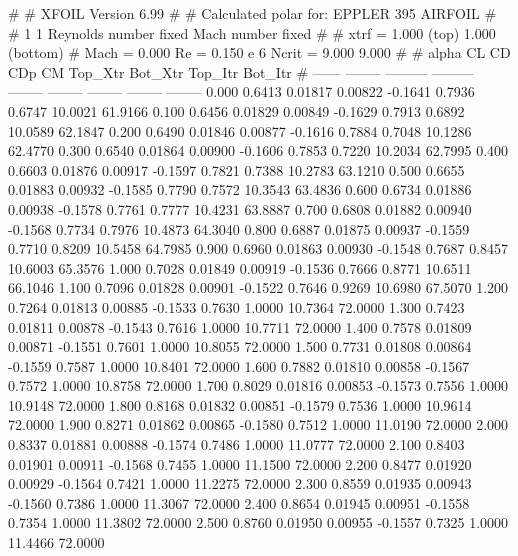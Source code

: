 #  
#       XFOIL         Version 6.99
#  
# Calculated polar for: EPPLER 395 AIRFOIL                              
#  
# 1 1 Reynolds number fixed          Mach number fixed         
#  
# xtrf =   1.000 (top)        1.000 (bottom)  
# Mach =   0.000     Re =     0.150 e 6     Ncrit =   9.000  9.000
#  
#   alpha    CL        CD       CDp       CM     Top_Xtr  Bot_Xtr  Top_Itr  Bot_Itr
#  ------ -------- --------- --------- -------- -------- -------- -------- --------
   0.000   0.6413   0.01817   0.00822  -0.1641   0.7936   0.6747  10.0021  61.9166
   0.100   0.6456   0.01829   0.00849  -0.1629   0.7913   0.6892  10.0589  62.1847
   0.200   0.6490   0.01846   0.00877  -0.1616   0.7884   0.7048  10.1286  62.4770
   0.300   0.6540   0.01864   0.00900  -0.1606   0.7853   0.7220  10.2034  62.7995
   0.400   0.6603   0.01876   0.00917  -0.1597   0.7821   0.7388  10.2783  63.1210
   0.500   0.6655   0.01883   0.00932  -0.1585   0.7790   0.7572  10.3543  63.4836
   0.600   0.6734   0.01886   0.00938  -0.1578   0.7761   0.7777  10.4231  63.8887
   0.700   0.6808   0.01882   0.00940  -0.1568   0.7734   0.7976  10.4873  64.3040
   0.800   0.6887   0.01875   0.00937  -0.1559   0.7710   0.8209  10.5458  64.7985
   0.900   0.6960   0.01863   0.00930  -0.1548   0.7687   0.8457  10.6003  65.3576
   1.000   0.7028   0.01849   0.00919  -0.1536   0.7666   0.8771  10.6511  66.1046
   1.100   0.7096   0.01828   0.00901  -0.1522   0.7646   0.9269  10.6980  67.5070
   1.200   0.7264   0.01813   0.00885  -0.1533   0.7630   1.0000  10.7364  72.0000
   1.300   0.7423   0.01811   0.00878  -0.1543   0.7616   1.0000  10.7711  72.0000
   1.400   0.7578   0.01809   0.00871  -0.1551   0.7601   1.0000  10.8055  72.0000
   1.500   0.7731   0.01808   0.00864  -0.1559   0.7587   1.0000  10.8401  72.0000
   1.600   0.7882   0.01810   0.00858  -0.1567   0.7572   1.0000  10.8758  72.0000
   1.700   0.8029   0.01816   0.00853  -0.1573   0.7556   1.0000  10.9148  72.0000
   1.800   0.8168   0.01832   0.00851  -0.1579   0.7536   1.0000  10.9614  72.0000
   1.900   0.8271   0.01862   0.00865  -0.1580   0.7512   1.0000  11.0190  72.0000
   2.000   0.8337   0.01881   0.00888  -0.1574   0.7486   1.0000  11.0777  72.0000
   2.100   0.8403   0.01901   0.00911  -0.1568   0.7455   1.0000  11.1500  72.0000
   2.200   0.8477   0.01920   0.00929  -0.1564   0.7421   1.0000  11.2275  72.0000
   2.300   0.8559   0.01935   0.00943  -0.1560   0.7386   1.0000  11.3067  72.0000
   2.400   0.8654   0.01945   0.00951  -0.1558   0.7354   1.0000  11.3802  72.0000
   2.500   0.8760   0.01950   0.00955  -0.1557   0.7325   1.0000  11.4466  72.0000
